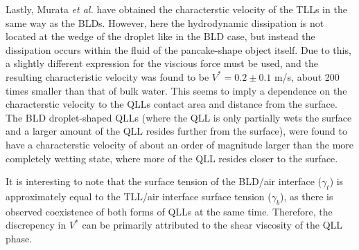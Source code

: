 Lastly, Murata \textit{et al.} have obtained the characterstic
velocity of the TLLs in the same way as the BLDs. However, here the
hydrodynamic dissipation is not located at the wedge of the droplet
like in the BLD case, but instead the dissipation occurs within the
fluid of the pancake-shape object itself. Due to this, a slightly
different expression for the viscious force must be used, and the
resulting characteristic velocity was found to be $V^* = 0.2 \pm 0.1$
m/s, about 200 times smaller than that of bulk water. This seems to
imply a dependence on the characterstic velocity to the QLLs contact
area and distance from the surface. The BLD droplet-shaped QLLs (where
the QLL is only partially wets the surface and a larger amount of the
QLL resides further from the surface), were found to have a
characterstic velocity of about an order of magnitude larger than the
more completely wetting state, where more of the QLL resides closer to
the surface.

It is interesting to note that the surface tension of the BLD/air
interface ($\gamma_t$) is approximately equal to the TLL/air interface
surface tension ($\gamma_b$), as there is observed coexistence of both
forms of QLLs at the same time. Therefore, the discrepency in $V^*$
can be primarily attributed to the shear viscosity of the QLL phase.
